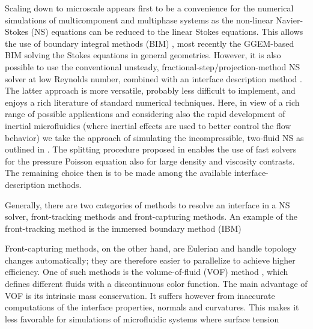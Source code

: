 Scaling down to microscale appears first to be a convenience for the numerical simulations of multicomponent and multiphase systems as the non-linear Navier-Stokes (NS) equations can be reduced to the linear Stokes equations. This allows the use of boundary integral methods (BIM) \cite{Pozrikidis}, \eg most recently the GGEM-based BIM \cite{Kumar_JCP_2012, Lailai_SM_2014} solving the Stokes equations in general geometries. However, it is also possible to use the conventional unsteady, fractional-step/projection-method NS solver at low Reynolds number, combined with an interface description method \cite{Worner_2012, Galusinski_JCP_2008}. The latter approach is more versatile, probably less difficult to implement, and enjoys a rich literature of standard numerical techniques. Here, in view of a rich range of possible applications and considering also the rapid development of inertial microfluidics (where inertial effects are used to better control the flow behavior) we take the approach of simulating the incompressible, two-fluid NS as outlined in \cite{Dodd_JCP_2014}. The splitting procedure proposed in \cite{Dodd_JCP_2014} enables the use of fast solvers for the pressure Poisson equation also for large density and viscosity contrasts. The remaining choice then is to be made among the available interface-description methods. 

Generally, there are two categories of methods to resolve an interface in a NS solver, \ie front-tracking methods and front-capturing methods. An example of the front-tracking method is the immersed boundary method (IBM) 

Front-capturing methods, on the other hand, are Eulerian and handle topology changes automatically; they are therefore easier to parallelize to achieve higher efficiency. One of such methods is the volume-of-fluid (VOF) method \cite{Scardovelli_ARFM_1999}, which defines different fluids with a discontinuous color function. The main advantage of VOF is its intrinsic mass conservation. It suffers however from inaccurate computations of the interface properties, \eg normals and curvatures. This makes it less favorable for simulations of microfluidic systems where surface tension 

